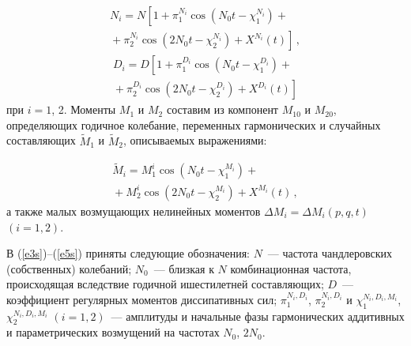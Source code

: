\begin{multicols}{2}
{}
\vspace*{-12pt}
\begin{multline}
N_i = N \left[ 1 + \pi_1^{N_i} \cos \left(N_0 t -\chi_1^{N_i}\right)\right. +{} \\
\left.{} + \pi_2^{N_i} \cos\left( 2 N_0 t -\chi_2^{N_i}\right) + X^{N_i}(t)\right]\,,\label{e3s}
\end{multline}
\begin{multline}
D_i = D \left[ 1 + \pi_1^{D_i} \cos \left(N_0 t -\chi_1^{D_i}\right)\right.  + {}\\
\left. {} + \pi_2^{D_i} \cos\left( 2 N_0 t -\chi_2^{D_i}\right) + X^{D_i}(t)\right]\label{e4s}
\end{multline}
при $i=1$, 2. Моменты $M_1$ и $M_2$ составим из компонент
$M_{10}$ и $M_{20}$, определяющих годичное колебание, переменных
гармонических и случайных составляющих $\tilde M_1$ и $\tilde M_2$,
описываемых выра\-же\-ниями:
{

}
\noindent
\begin{multline}
\tilde M_i = M_1^i \cos \left( N_0 t -\chi_1^{M_i}\right)+{}\\
{} + M_2^i \cos \left( 2 N_0 t - \chi_2^{M_i}\right) + X^{M_i} (t)\,,\label{e5s}
\end{multline}
а также малых возмущающих нелинейных моментов $\Delta M_i =\Delta M_i (p,q,t)$\ $(i=1,2)$.

В (\ref{e3s})--(\ref{e5s}) приняты следующие обозначения:
 $N$~--- частота чандлеровских (собственных) колебаний;
 $N_0$~--- близкая к $N$ комбинационная час\-то\-та, происходящая
вследствие годичной и\linebreak шестилетней составляющих;
 $D$~--- коэффициент регулярных моментов диссипативных сил;
 $\pi_1^{N_i,D_i}$, $\pi_2^{N_i,D_i}$ и $\chi_1^{N_i,D_i,M_i}$,
 $\chi_2^{N_i,D_i,M_i}$ $(i=1,2)$~--- амплитуды и начальные фазы гармонических аддитивных и
параметрических возмущений на частотах $N_0$,\linebreak
 $2 N_0$.


\end{multicols}
